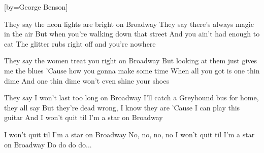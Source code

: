 [by={George Benson}]

  \chordsoff

  \beginverse
  They say the neon lights are bright on Broadway
  They say there's always magic in the air
  But when you're walking down that street
  And you ain't had enough to eat
  The glitter rubs right off and you're nowhere
  \endverse

  \beginverse
  They say the women treat you right on Broadway
  But looking at them just gives me the blues
  'Cause how you gonna make some time
  When all you got is one thin dime
  And one thin dime won't even shine your shoes
  \endverse

  \beginverse
  They say I won't last too long on Broadway
  I'll catch a Greyhound bus for home, they all say
  But they're dead wrong, I know they are
  'Cause I can play this guitar
  And I won't quit til I'm a star on Broadway
  \endverse

  \beginverse
  I won't quit til I'm a star on Broadway
  No, no, no, no
  I won't quit til I'm a star on Broadway
  Do do do do...
  \endverse
\endsong
